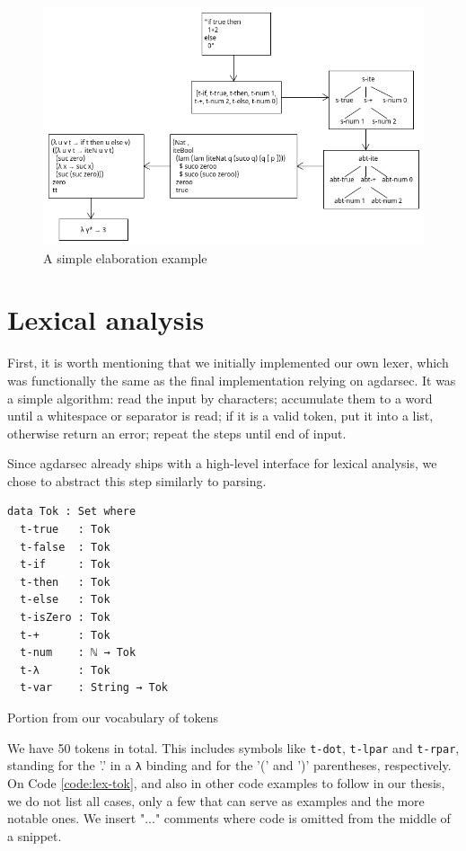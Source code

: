 \begin{figure}[h!]
	\centering
	\includegraphics[width=1.0\textwidth]{../images/example-1.png}
	\caption{A simple elaboration example}
	\label{fig:example-1}
\end{figure}

\section{Lexical analysis} \label{sec:lexer}

First, it is worth mentioning that we initially implemented our own lexer, which was functionally the same as the final implementation relying on agdarsec. It was a simple algorithm: read the input by characters; accumulate them to a word until a whitespace or separator is read; if it is a valid token, put it into a list, otherwise return an error; repeat the steps until end of input.

Since agdarsec already ships with a high-level interface for lexical analysis, we chose to abstract this step similarly to parsing.

\begin{listing}[H]
\begin{verbatim}
data Tok : Set where
  t-true   : Tok
  t-false  : Tok
  t-if     : Tok
  t-then   : Tok
  t-else   : Tok
  t-isZero : Tok
  t-+      : Tok
  t-num    : ℕ → Tok
  t-λ      : Tok
  t-var    : String → Tok
\end{verbatim}
\caption{Portion from our vocabulary of tokens}
\label{code:lex-tok}
\end{listing}

We have 50 tokens in total. This includes symbols like \verb$t-dot$, \verb$t-lpar$ and \verb$t-rpar$, standing for the '.' in a \verb$λ$ binding and for the '(' and ')' parentheses, respectively. On Code \ref{code:lex-tok}, and also in other code examples to follow in our thesis, we do not list all cases, only a few that can serve as examples and the more notable ones. We insert "..." comments where code is omitted from the middle of a snippet.


